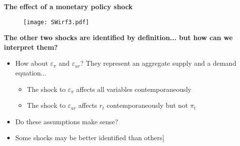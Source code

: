 \documentclass[10pt,handout]{beamer}
\begin{document}
\vspace{.1cm}

\begin{frame}
{\textbf{The effect of a monetary policy shock}} 
\begin{figure}[h]
\centering\texttt{[image: SWirf3.pdf]}
\end{figure}
\end{frame}

\vspace{.1cm}

\begin{frame}
{\textbf{The other two shocks are identified by definition... but how can we
interpret them?}}

\begin{itemize}
\item How about $\varepsilon _{\pi }$ and $\varepsilon _{ur}$? They
represent an aggregate supply and a demand equation...

\begin{itemize}
\item The shock to $\varepsilon _{\pi }$ affects all variables
contemporaneously

\item The shock to $\varepsilon _{ur}$ affects $r_{t}$ contemporaneously but
not $\pi _{t}$\pause\bigskip
\end{itemize}

\item Do these assumptions make sense?\pause\bigskip

\item \lbrack Some shocks may be better identified than others]
\end{itemize}
\end{frame}

\vspace{.1cm}
\end{document}
